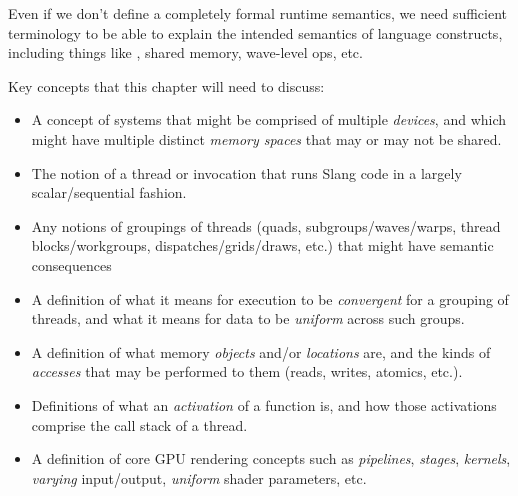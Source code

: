 
\begin{TODO}
Even if we don't define a completely formal runtime semantics, we need sufficient terminology to be able to explain the intended semantics of language constructs, including things like , shared memory, wave-level ops, etc.

Key concepts that this chapter will need to discuss:

\begin{itemize}
\item A concept of systems that might be comprised of multiple \emph{devices}, and which might have multiple distinct \emph{memory spaces} that may or may not be shared.

\item The notion of a thread or invocation that runs Slang code in a largely scalar/sequential fashion.

\item Any notions of groupings of threads (quads, subgroups/waves/warps, thread blocks/workgroups, dispatches/grids/draws, etc.) that might have semantic consequences

\item A definition of what it means for execution to be \emph{convergent} for a grouping of threads, and what it means for data to be \emph{uniform} across such groups.

\item A definition of what memory \emph{objects} and/or \emph{locations} are, and the kinds of \emph{accesses} that may be performed to them (reads, writes, atomics, etc.).

\item Definitions of what an \emph{activation} of a function is, and how those activations comprise the call stack of a thread.

\item A definition of core GPU rendering concepts such as \emph{pipelines}, \emph{stages}, \emph{kernels}, \emph{varying} input/output, \emph{uniform} shader parameters, etc.
\end{itemize}

\end{TODO}
